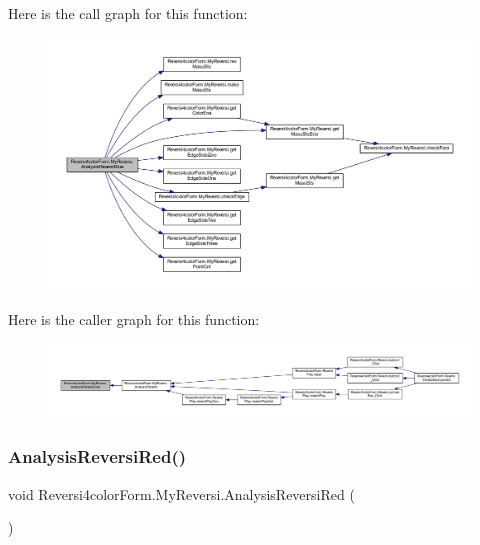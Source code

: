 Here is the call graph for this function\+:
\nopagebreak
\begin{figure}[H]
\begin{center}
\leavevmode
\includegraphics[width=350pt]{class_reversi4color_form_1_1_my_reversi_a07c18a7adbcc3bd0993673f0a8f63c85_cgraph}
\end{center}
\end{figure}
Here is the caller graph for this function\+:
\nopagebreak
\begin{figure}[H]
\begin{center}
\leavevmode
\includegraphics[width=350pt]{class_reversi4color_form_1_1_my_reversi_a07c18a7adbcc3bd0993673f0a8f63c85_icgraph}
\end{center}
\end{figure}
\mbox{\label{class_reversi4color_form_1_1_my_reversi_a2d0c12ed7036def583e06ca4df37f367}} 
\subsubsection{\texorpdfstring{Analysis\+Reversi\+Red()}{AnalysisReversiRed()}}
{\footnotesize\ttfamily void Reversi4color\+Form.\+My\+Reversi.\+Analysis\+Reversi\+Red (\begin{DoxyParamCaption}{ }\end{DoxyParamCaption})\hspace{0.3cm}{\ttfamily [private]}}



